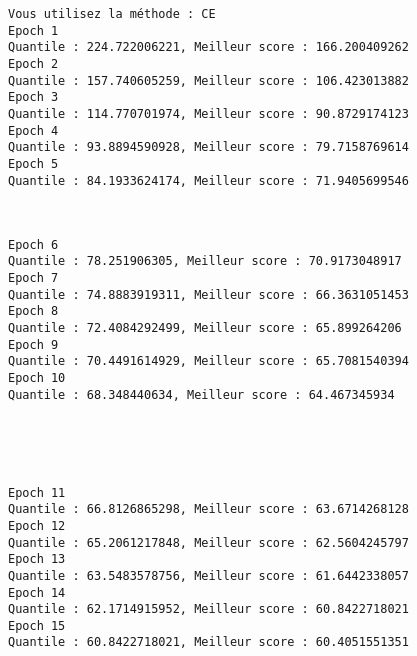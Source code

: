 \documentclass[11pt]{article}
\begin{document}
    \begin{Verbatim}[commandchars=\\\{\}]
Vous utilisez la méthode : CE
Epoch 1
Quantile : 224.722006221, Meilleur score : 166.200409262
Epoch 2
Quantile : 157.740605259, Meilleur score : 106.423013882
Epoch 3
Quantile : 114.770701974, Meilleur score : 90.8729174123
Epoch 4
Quantile : 93.8894590928, Meilleur score : 79.7158769614
Epoch 5
Quantile : 84.1933624174, Meilleur score : 71.9405699546

    \end{Verbatim}

    \begin{center}
    \end{center}
    { \hspace*{\fill} \\}
    
    \begin{Verbatim}[commandchars=\\\{\}]
Epoch 6
Quantile : 78.251906305, Meilleur score : 70.9173048917
Epoch 7
Quantile : 74.8883919311, Meilleur score : 66.3631051453
Epoch 8
Quantile : 72.4084292499, Meilleur score : 65.899264206
Epoch 9
Quantile : 70.4491614929, Meilleur score : 65.7081540394
Epoch 10
Quantile : 68.348440634, Meilleur score : 64.467345934

    \end{Verbatim}

    \begin{center}
    \end{center}
    { \hspace*{\fill} \\}
    
    \begin{center}
    \end{center}
    { \hspace*{\fill} \\}
    
    \begin{Verbatim}[commandchars=\\\{\}]
Epoch 11
Quantile : 66.8126865298, Meilleur score : 63.6714268128
Epoch 12
Quantile : 65.2061217848, Meilleur score : 62.5604245797
Epoch 13
Quantile : 63.5483578756, Meilleur score : 61.6442338057
Epoch 14
Quantile : 62.1714915952, Meilleur score : 60.8422718021
Epoch 15
Quantile : 60.8422718021, Meilleur score : 60.4051551351

    \end{Verbatim}
\end{document}
